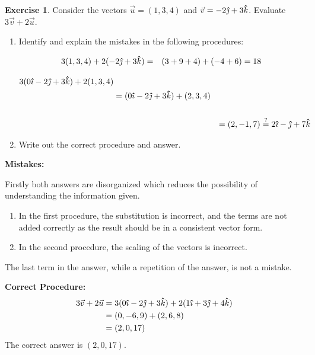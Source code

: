 \documentclass[12pt]{article}
\theoremstyle{plain}
\theoremstyle{definition}
\newtheorem{Ej}[Th]{Exercise}         %
\theoremstyle{remark}
\newcommand{\thickhat}[1]{\mathbf{\hat{\text{$#1$}}}}
\newcommand{\ii}{\vu{\imath}}
\newcommand{\jj}{\vu{\jmath}}
\newcommand{\kk}{\thickhat{k}}
\renewcommand{\:}{\colon}           %
\renewcommand{\.}{\Cdot}                %
\begin{document}

\begin{Ej}
  Consider the vectors $\vec{u} = (1, 3, 4)$ and $\vec{v} = -2\jj + 3\kk$. Evaluate $3\vec{v} + 2\vec{u}$.
  \begin{enumerate}
    \item Identify and explain the mistakes in the following procedures:
    \begin{ptcb}
      \begin{align*}
        3(1,3,4)+2(-2\jj+3\kk)&=&(3+9+4)+(-4+6)=18
      \end{align*}
    \end{ptcb}
    \begin{ptcb}
      \begin{align*}
        3(0\ii-2\jj+3\kk)+2(1,3,4)&\\
        &=(0\ii-2\jj+3\kk)+(2,3,4)\\
        &\\
        &&=(2,-1,7)\overset{?}{=}2\ii-\jj+7\kk
      \end{align*}
    \end{ptcb}
    \item Write out the correct procedure and answer.
  \end{enumerate}
  \end{Ej}

  \begin{ptcb}
    \textbf{Mistakes:}\par
    Firstly both answers are disorganized which reduces the possibility of understanding the information given.
\begin{enumerate}
  \item In the first procedure, the substitution is incorrect, and the terms are not added correctly as the result should be in a consistent vector form.
  \item In the second procedure, the scaling of the vectors is incorrect. 
\end{enumerate}
The last term in the answer, while a repetition of the answer, is not a mistake.\par
\textbf{Correct Procedure:}
\begin{align*}
  3\vec{v} + 2\vec{u} &= 3(0\ii - 2\jj + 3\kk) + 2(1\ii + 3\jj + 4\kk) \\
  &= (0, -6, 9) + (2, 6, 8) \\
  &= (2, 0, 17)
\end{align*}
The correct answer is $(2, 0, 17)$.

  \end{ptcb}
\end{document}
